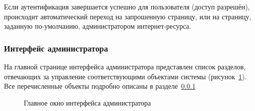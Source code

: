 Если аутентификация завершается успешно для пользователя (доступ разрешён), происходит автоматический переход на запрошенную страницу, или на страницу, заданную по-умолчанию, администратором интернет-ресурса.  

\subsubsection{Интерфейс администратора}

На главной странице интерфейса администратора представлен список разделов, отвечающих за управление соответствующими объектами системы (рисунок~\ref{fig:admin_main}). Все перечисленные объекты подробно описаны в разделе~\ref{} 

\begin{figure}[hbt!]
\caption{Главное окно интерфейса администратора}
\label{fig:admin_main}
\end{figure}










